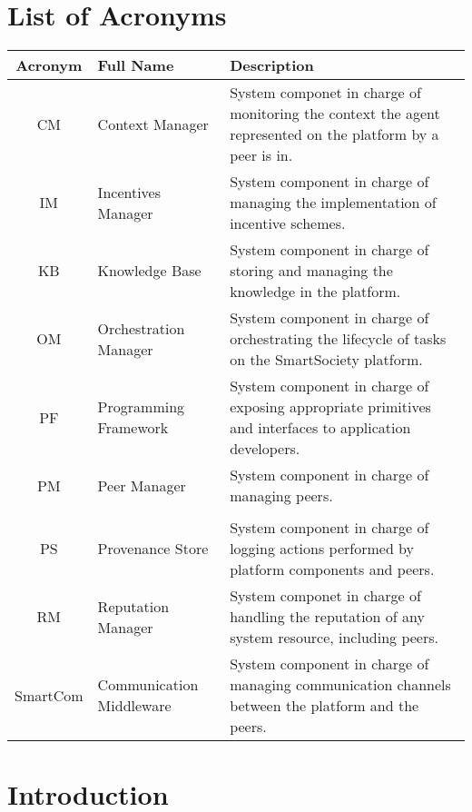 \documentclass{SmartReport}
\begin{document}
\section*{List of Acronyms}
\begin{tabular}{|c|p{3cm}|p{10cm}|}
\hline 
\textbf{Acronym} & \textbf{Full Name} & \textbf{Description} \\
\hline 
\hline 
CM & Context Manager & System componet in charge of monitoring the
context the agent represented on the platform by a peer is in.\\
\hline
IM & Incentives Manager & System component in charge of managing the implementation of incentive schemes.\\  
\hline 
KB & Knowledge Base &  System component in charge of storing and managing the knowledge in the platform.\\
\hline
OM & Orchestration Manager &  System component in charge of
orchestrating the lifecycle of tasks on the SmartSociety platform. \\
\hline 
PF & Programming Framework &  System component in charge of exposing
appropriate primitives and interfaces to application developers.\\
\hline 
PM & Peer Manager &  System component in charge of managing peers.\\
\hline \\
PS & Provenance Store & System component in charge of logging actions performed by platform components and peers.\\
\hline
RM & Reputation Manager & System componet in charge of handling the reputation of any system resource, including peers. \\
\hline
SmartCom & Communication Middleware & System component in charge of managing
communication channels between the platform and the peers. \\
\hline
\end{tabular}

\newpage


\section{Introduction}
\label{sec:intro}

\end{document}
